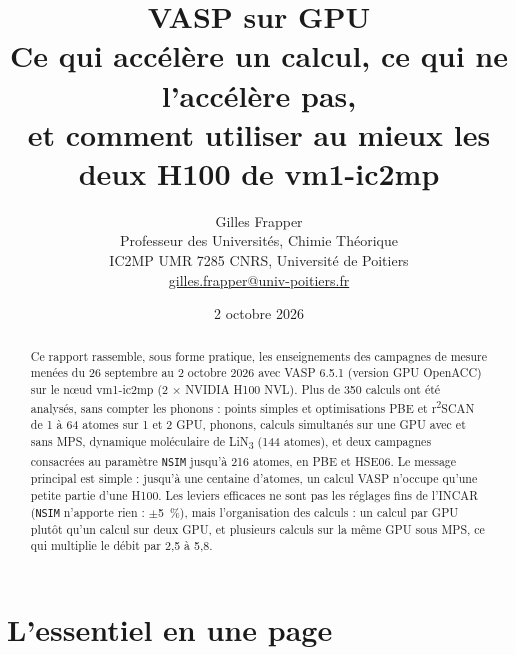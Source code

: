 \documentclass[11pt,a4paper]{article}
\title{VASP sur GPU\\[4pt]
\large Ce qui accélère un calcul, ce qui ne l'accélère pas,\\
et comment utiliser au mieux les deux H100 de vm1-ic2mp}
\author{Gilles Frapper \\ Professeur des Universités, Chimie Théorique \\
IC2MP UMR 7285 CNRS, Université de Poitiers \\
\href{mailto:gilles.frapper@univ-poitiers.fr}{gilles.frapper@univ-poitiers.fr}}
\date{2 octobre 2026}
\newcommand{\rscan}{r\textsuperscript{2}SCAN}
\begin{document}
\maketitle

\begin{abstract}
Ce rapport rassemble, sous forme pratique, les enseignements des campagnes de mesure menées
du 26 septembre au 2 octobre 2026 avec VASP 6.5.1 (version GPU OpenACC) sur le nœud
vm1-ic2mp (2 × NVIDIA H100 NVL). Plus de 350 calculs ont été analysés, sans compter les phonons : points simples et
optimisations PBE et \rscan{} de 1 à 64 atomes sur 1 et 2 GPU, phonons, calculs simultanés
sur une GPU avec et sans MPS, dynamique moléculaire de LiN\textsubscript{3} (144 atomes),
et deux campagnes consacrées au paramètre \texttt{NSIM} jusqu'à 216 atomes, en PBE et HSE06.
Le message principal est simple : jusqu'à une centaine d'atomes, un calcul VASP n'occupe
qu'une petite partie d'une H100. Les leviers efficaces ne sont pas les réglages fins de
l'INCAR (\texttt{NSIM} n'apporte rien : $\pm$\SI{5}{\percent}), mais l'organisation des
calculs : un calcul par GPU plutôt qu'un calcul sur deux GPU, et plusieurs calculs sur la même
GPU sous MPS, ce qui multiplie le débit par 2,5 à 5,8.
\end{abstract}

\section*{L'essentiel en une page}
\end{document}
